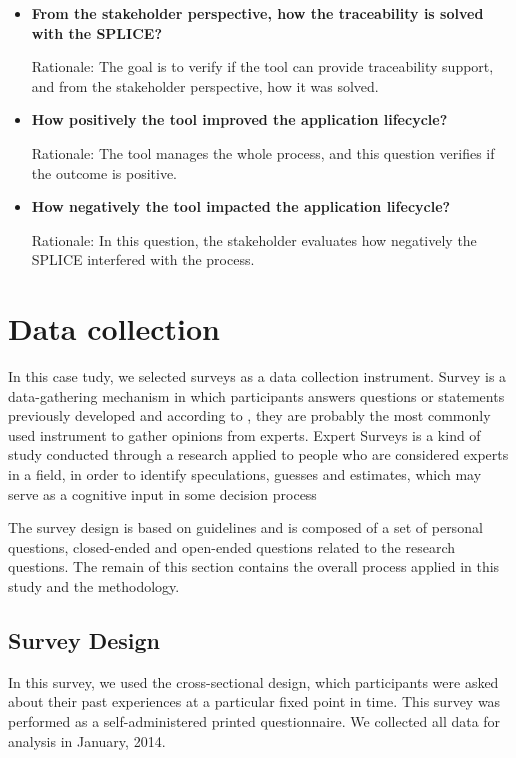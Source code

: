 \begin{itemize}
\item \textbf{From the stakeholder perspective, how the traceability is solved with the \ac{SPLICE}?}

Rationale: The goal is to verify if the tool can provide traceability support, and from the stakeholder perspective, how it was solved.

\item \textbf{How positively the tool improved the application lifecycle?}

Rationale: The tool manages the whole process, and this question verifies if the outcome is positive.
\item \textbf{How negatively the tool impacted the application lifecycle?}

Rationale: In this question, the stakeholder evaluates how negatively the \ac{SPLICE} interfered with the process.
\end{itemize}



\section{Data collection}
\label{sc:researchMethod}

In this case tudy, we selected surveys as a data collection instrument. Survey  is  a  data-gathering  mechanism  in  which participants answers  questions  or  statements  previously developed and according to \cite{Kitchenham2008} , they are probably  the  most  commonly used instrument to gather opinions from experts. Expert Surveys is a kind of study conducted through a research  applied  to  people  who  are  considered  experts  in  a  field,  in  order  to  identify speculations,  guesses  and  estimates,  which  may  serve  as  a  cognitive  input  in  some decision process \citep{Chhibber1992} 


The survey design is based on \cite{Kitchenham2008} guidelines and is composed of a set of personal questions, closed-ended and open-ended questions related to the research questions. The remain of this section contains the overall process applied in this study and the methodology.

\subsection{Survey Design}

In  this  survey,  we  used  the  cross-sectional  design,  which  participants  were  asked  about  their  past  experiences  at  a  particular  fixed point in time. This survey was performed as a self-administered printed questionnaire. We  collected  all  data  for  analysis in January, 2014.  

